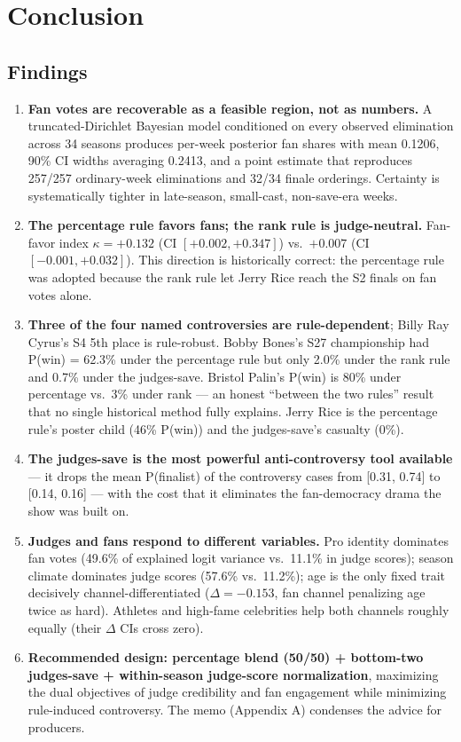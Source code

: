 \documentclass{article}
\begin{document}
\section{Conclusion}
\label{sec:conclusion}

\subsection{Findings}

\begin{enumerate}
  \item \textbf{Fan votes are recoverable as a feasible region, not as numbers.} A truncated-Dirichlet Bayesian model conditioned on every observed elimination across 34 seasons produces per-week posterior fan shares with mean 0.1206, 90\% CI widths averaging 0.2413, and a point estimate that reproduces 257/257 ordinary-week eliminations and 32/34 finale orderings. Certainty is systematically tighter in late-season, small-cast, non-save-era weeks.
  \item \textbf{The percentage rule favors fans; the rank rule is judge-neutral.} Fan-favor index $\kappa = +0.132$ (CI $[+0.002, +0.347]$) vs.\ $+0.007$ (CI $[-0.001, +0.032]$). This direction is historically correct: the percentage rule was adopted because the rank rule let Jerry Rice reach the S2 finals on fan votes alone.
  \item \textbf{Three of the four named controversies are rule-dependent}; Billy Ray Cyrus's S4 5th place is rule-robust. Bobby Bones's S27 championship had P(win) = 62.3\% under the percentage rule but only 2.0\% under the rank rule and 0.7\% under the judges-save. Bristol Palin's P(win) is 80\% under percentage vs.\ 3\% under rank --- an honest ``between the two rules'' result that no single historical method fully explains. Jerry Rice is the percentage rule's poster child (46\% P(win)) and the judges-save's casualty (0\%).
  \item \textbf{The judges-save is the most powerful anti-controversy tool available} --- it drops the mean P(finalist) of the controversy cases from [0.31, 0.74] to [0.14, 0.16] --- with the cost that it eliminates the fan-democracy drama the show was built on.
  \item \textbf{Judges and fans respond to different variables.} Pro identity dominates fan votes (49.6\% of explained logit variance vs.\ 11.1\% in judge scores); season climate dominates judge scores (57.6\% vs.\ 11.2\%); age is the only fixed trait decisively channel-differentiated ($\Delta = -0.153$, fan channel penalizing age twice as hard). Athletes and high-fame celebrities help both channels roughly equally (their $\Delta$ CIs cross zero).
  \item \textbf{Recommended design: percentage blend (50/50) + bottom-two judges-save + within-season judge-score normalization}, maximizing the dual objectives of judge credibility and fan engagement while minimizing rule-induced controversy. The memo (Appendix A) condenses the advice for producers.
\end{enumerate}
\end{document}
